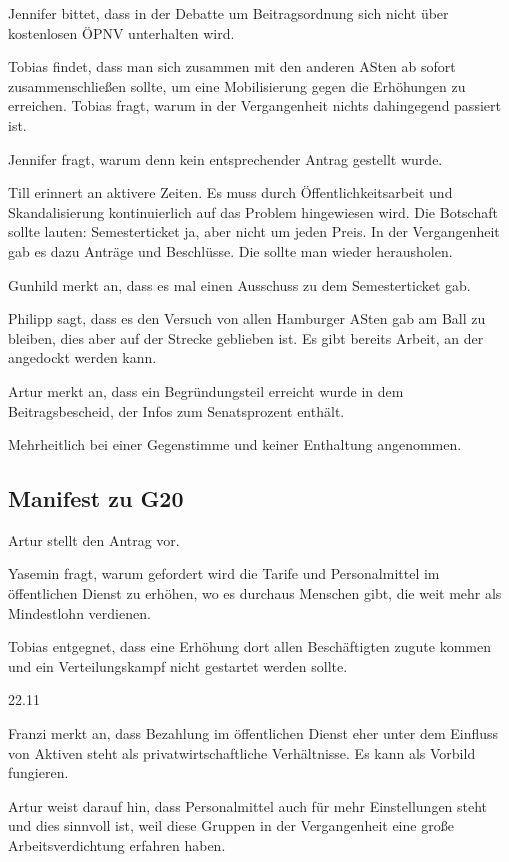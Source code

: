 \documentclass[ngerman,headheight=70pt]{scrartcl}
\begin{document}
    Jennifer bittet, dass in der Debatte um Beitragsordnung sich nicht über
    kostenlosen ÖPNV unterhalten wird.

    Tobias findet, dass man sich zusammen mit den anderen ASten ab sofort
    zusammenschließen sollte, um eine Mobilisierung gegen die Erhöhungen zu
    erreichen. Tobias fragt, warum in der Vergangenheit nichts dahingegend passiert
    ist.

    Jennifer fragt, warum denn kein entsprechender Antrag gestellt wurde.

    Till erinnert an aktivere Zeiten. Es muss durch Öffentlichkeitsarbeit und
    Skandalisierung kontinuierlich auf das Problem hingewiesen wird. Die Botschaft
    sollte lauten: Semesterticket ja, aber nicht um jeden Preis.
    In der Vergangenheit gab es dazu Anträge und Beschlüsse. Die sollte man
    wieder herausholen.

    Gunhild merkt an, dass es mal einen Ausschuss zu dem Semesterticket gab.

    Philipp sagt, dass es den Versuch von allen Hamburger ASten gab am Ball zu
    bleiben, dies aber auf der Strecke geblieben ist. Es gibt bereits Arbeit,
    an der angedockt werden kann.

    Artur merkt an, dass ein Begründungsteil erreicht wurde in dem Beitragsbescheid,
    der Infos zum Senatsprozent enthält.

    Mehrheitlich bei einer Gegenstimme und keiner Enthaltung angenommen.

    \subsection{Manifest zu G20}

    Artur stellt den Antrag vor.

    Yasemin fragt, warum gefordert wird die Tarife und Personalmittel im
    öffentlichen Dienst zu erhöhen, wo es durchaus Menschen gibt, die weit mehr
    als Mindestlohn verdienen.

    Tobias entgegnet, dass eine Erhöhung dort allen Beschäftigten zugute kommen
    und ein Verteilungskampf nicht gestartet werden sollte.

    22.11

    Franzi merkt an, dass Bezahlung im öffentlichen Dienst eher unter dem Einfluss
    von Aktiven steht als privatwirtschaftliche Verhältnisse. Es kann als Vorbild
    fungieren.

    Artur weist darauf hin, dass Personalmittel auch für mehr Einstellungen
    steht und dies sinnvoll ist, weil diese Gruppen in der Vergangenheit eine
    große Arbeitsverdichtung erfahren haben.
\end{document}
